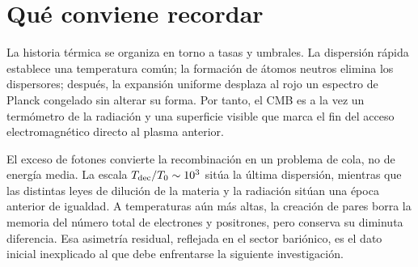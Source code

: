 \begin{classroomqa}
\end{classroomqa}

\section{Qué conviene recordar}

La historia térmica se organiza en torno a tasas y umbrales. La dispersión rápida establece una temperatura común; la formación de átomos neutros elimina los dispersores; después, la expansión uniforme desplaza al rojo un espectro de Planck congelado sin alterar su forma. Por tanto, el CMB es a la vez un termómetro de la radiación y una superficie visible que marca el fin del acceso electromagnético directo al plasma anterior.

El exceso de fotones convierte la recombinación en un problema de cola, no de energía media. La escala \(T_{\rm dec}/T_0\sim10^3\) sitúa la última dispersión, mientras que las distintas leyes de dilución de la materia y la radiación sitúan una época anterior de igualdad. A temperaturas aún más altas, la creación de pares borra la memoria del número total de electrones y positrones, pero conserva su diminuta diferencia. Esa asimetría residual, reflejada en el sector bariónico, es el dato inicial inexplicado al que debe enfrentarse la siguiente investigación.
